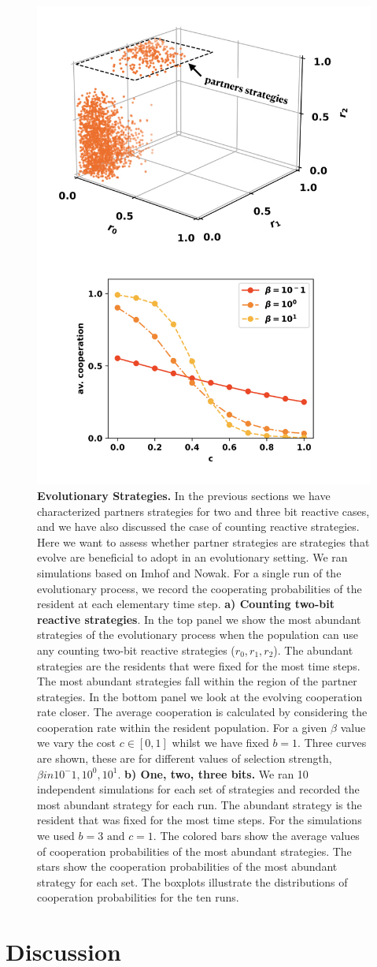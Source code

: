\documentclass{article}
\theoremstyle{definition}
\begin{document}
\begin{figure}[h!]
  \centering
  \includegraphics[width=.5\textwidth]{figures/evolutionary_dynamics_discounting.jpeg}
  \caption{\textbf{Evolutionary Strategies.} In the previous sections we have
  characterized partners strategies for two and three bit reactive cases, and we
  have also discussed the case of counting reactive strategies. Here we want to
  assess whether partner strategies are strategies that evolve are beneficial to
  adopt in an evolutionary setting. We ran simulations based on Imhof and Nowak.
  For a single run of the evolutionary process, we record the cooperating
  probabilities of the resident at each elementary time step. \textbf{a) Counting
  two-bit reactive strategies}. In the top panel we show the most abundant
  strategies of the evolutionary process when the population can use any
  counting two-bit reactive strategies ($r_0, r_1, r_2$). The abundant
  strategies are the residents that were fixed for the most time steps.
  The most abundant strategies fall within the region of the partner strategies.
  In the bottom panel we look at the evolving cooperation rate closer. The
  average cooperation is calculated by considering the cooperation rate within
  the resident population. For a given $\beta$ value we vary the cost $c \in [0, 1]$
  whilst we have fixed $b=1$. Three curves are shown, these are for different values
  of selection strength, $\beta in {10^-1, 10^0, 10^1}$.
  \textbf{b) One, two, three bits.} We ran 10 independent simulations for each
  set of strategies and recorded the most abundant strategy for each run. The
  abundant strategy is the resident that was fixed for the most time steps. For
  the simulations we used \(b=3 \text{ and } c=1\). The colored bars show the
  average values of cooperation probabilities of the most abundant strategies.
  The stars show the cooperation probabilities of the most abundant strategy for
  each set. The boxplots illustrate the distributions of cooperation
  probabilities for the ten runs.}
\end{figure}

\section{Discussion}

~\\

\end{document}
